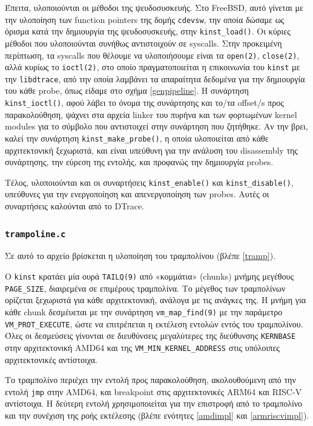 \documentclass[12pt]{article}
\begin{document}
Έπειτα, υλοποιούνται οι μέθοδοι της ψευδοσυσκευής. Στο FreeBSD, αυτό γίνεται με
την υλοποίηση των function pointers της δομής \lstinline{cdevsw}, την οποία
δώσαμε ως όρισμα κατά την δημιουργία της ψευδοσυσκευής, στην
\lstinline{kinst_load()}. Οι κύριες μέθοδοι που υλοποιούνται συνήθως
αντιστοιχούν σε syscalls. Στην προκειμένη περίπτωση, τα syscalls που θέλουμε να
υλοποιήσουμε είναι τα \lstinline{open(2)}, \lstinline{close(2)}, αλλά κυρίως το
\lstinline{ioctl(2)}, στο οποίο πραγματοποιείται η επικοινωνία του
\lstinline{kinst} με την \lstinline{libdtrace}, από την οποία λαμβάνει τα
απαραίτητα δεδομένα για την δημιουργία του κάθε probe, όπως είδαμε στο σχήμα
\ref{genpipeline}. Η συνάρτηση \lstinline{kinst_ioctl()}, αφού λάβει το όνομα
της συνάρτησης και το/τα offset/s προς παρακολούθηση, ψάχνει στα αρχεία linker
του πυρήνα και των φορτωμένων kernel modules για το σύμβολο που αντιστοιχεί
στην συνάρτηση που ζητήθηκε. Αν την βρει, καλεί την συνάρτηση
\lstinline{kinst_make_probe()}, η οποία υλοποιείται από κάθε αρχιτεκτονική
ξεχωριστά, και είναι υπεύθυνη για την ανάλυση του disassembly της συνάρτησης,
την εύρεση της εντολής, και προφανώς την δημιουργία probes.

Τέλος, υλοποιούνται και οι συναρτήσεις \lstinline{kinst_enable()} και
\lstinline{kinst_disable()}, υπεύθυνες για την ενεργοποίηση και απενεργοποίηση
των probes. Αυτές οι συναρτήσεις καλούνται από το DTrace.

\subsubsection{\lstinline{trampoline.c}}

Σε αυτό το αρχείο βρίσκεται η υλοποίηση του τραμπολίνου (βλέπε \ref{tramp}).

Ο \lstinline{kinst} κρατάει μία ουρά \lstinline{TAILQ(9)} από «κομμάτια»
(chunks) μνήμης μεγέθους \lstinline{PAGE_SIZE}, διαιρεμένα σε επιμέρους
τραμπολίνα. Το μέγεθος των τραμπολίνων ορίζεται ξεχωριστά για κάθε
αρχιτεκτονική, ανάλογα με τις ανάγκες της. Η μνήμη για κάθε chunk δεσμέυεται με
την συνάρτηση \lstinline{vm_map_find(9)} με την παράμετρο
\lstinline{VM_PROT_EXECUTE}, ώστε να επιτρέπεται η εκτέλεση εντολών εντός του
τραμπολίνου. Όλες οι δεσμεύσεις γίνονται σε διευθύνσεις μεγαλύτερες της
διεύθυνσης \lstinline{KERNBASE} στην αρχιτεκτονική AMD64 και της
\lstinline{VM_MIN_KERNEL_ADDRESS} στις υπόλοιπες αρχιτεκτονικές αντίστοιχα.

Το τραμπολίνο περιέχει την εντολή προς παρακολούθηση, ακολουθούμενη από την
εντολή \lstinline{jmp} στην AMD64, και breakpoint στις αρχιτεκτονικές ARM64 και
RISC-V αντίστοιχα. Η δεύτερη εντολή χρησιμοποιείται για την επιστροφή από το
τραμπολίνο και την συνέχιση της ροής εκτέλεσης (βλέπε ενότητες \ref{amdimpl}
και \ref{armriscvimpl}).
\end{document}
